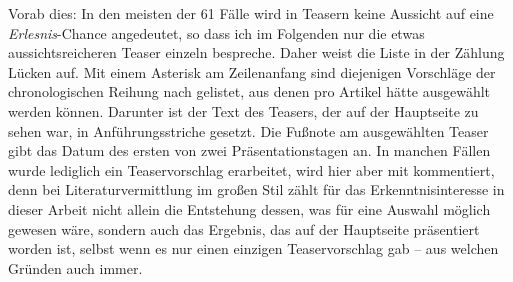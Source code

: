 \documentclass[fontsize=12pt]{scrartcl}
\begin{document}
Vorab dies: In den meisten der 61 F\"alle wird in Teasern keine Aussicht auf eine \textit{Erlesnis}-Chance angedeutet, so dass ich im Folgenden nur die etwas aussichts\-rei\-cheren Teaser einzeln bespreche. Daher weist die Liste in der Z\"ahlung L\"ucken auf. Mit einem Asterisk am Zeilenanfang sind diejenigen Vorschl\"age der chronologischen Reihung nach gelistet, aus denen pro Artikel h\"atte ausgew\"ahlt werden k\"onnen. Darunter ist der Text des Teasers, der auf der Hauptseite zu sehen war, in Anf\"uh\-rungs\-striche gesetzt. Die Fu{\ss}note am ausgew\"ahlten Teaser gibt das Datum des ersten von zwei Pr\"asentationstagen an. In manchen F\"allen wurde lediglich ein Teaservorschlag erarbeitet, wird \mbox{hier} aber mit kommentiert, denn bei Li\-te\-ra\-tur\-ver\-mitt\-lung im gro{\ss}en Stil z\"ahlt f\"ur das Erkenntnisinteresse in dieser Arbeit nicht allein die Entstehung dessen, was f\"ur eine Auswahl m\"oglich gewesen w\"are, sondern auch das Ergebnis, das auf der Hauptseite pr\"asentiert worden ist, \mbox{selbst} wenn es nur einen einzigen Teaservorschlag gab -- aus welchen Gr\"unden auch immer.

\singlespacing
\end{document}
